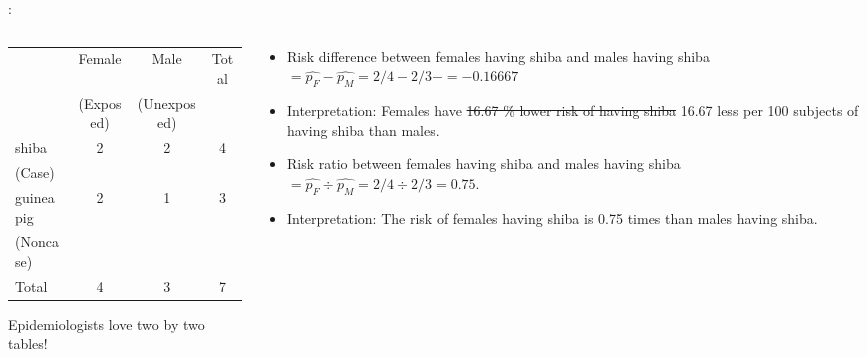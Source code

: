 \begin{frame}{\secname: \subsecname}
\begin{columns}[t]
\begin{column}{0.5\textwidth}
\vspace{-10mm}
\begin{table}[h]
	\scriptsize
\begin{center}
\begin{tabular}{lccc}
\toprule
   & Female    & Male            & Total  \\ 
   & (Exposed) & (Unexposed)     &        \\ \midrule
shiba  & 2        & 2            & 4         \\
(Case) &          &              &           \\
guinea pig   & 2        & 1            & 3   \\
(Noncase) &          &              &           \\

Total  & 4        & 3            & 7     \\ \bottomrule
\end{tabular}
\end{center}
\end{table}

Epidemiologists love two by two tables!
\end{column}
    
\begin{column}{0.5\textwidth}
	\normalsize
	\begin{itemize}
		\item<2|handout:2-> Risk difference between females having shiba and males having shiba $= \widehat{p_F}- \widehat{p_M} = 2/4 - 2/3 -  = - 0.16667$
		\item<2|handout:2-> Interpretation: Females have \st{16.67 \% lower risk of having shiba}  16.67 less per 100 subjects of having shiba than males. 
		\newline
		\item<3|handout:3> Risk ratio between females having shiba and males having shiba  $= \widehat{p_F} \div  \widehat{p_M} = 2/4 \div 2/3    = 0.75$.
		\item<3|handout:3> Interpretation: The risk of females having shiba is 0.75 times than males having shiba.

	\end{itemize}
\end{column}
    
\end{columns}
\end{frame}

